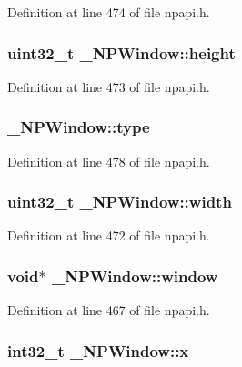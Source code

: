 Definition at line 474 of file npapi.h.

\hypertarget{struct___n_p_window_a971f3f5aecbf2d5b0796bb0b6c4339c1}{
\subsubsection[{height}]{\setlength{\rightskip}{0pt plus 5cm}uint32\_\-t {\bf \_\-NPWindow::height}}}
\label{struct___n_p_window_a971f3f5aecbf2d5b0796bb0b6c4339c1}


Definition at line 473 of file npapi.h.

\hypertarget{struct___n_p_window_a56b609c5f878624bae8fa3840cff0ea4}{
\subsubsection[{type}]{ {\bf \_\-NPWindow::type}}}
\label{struct___n_p_window_a56b609c5f878624bae8fa3840cff0ea4}


Definition at line 478 of file npapi.h.

\hypertarget{struct___n_p_window_a108a91a5fdc3e8130e0d40406612bd65}{
\subsubsection[{width}]{\setlength{\rightskip}{0pt plus 5cm}uint32\_\-t {\bf \_\-NPWindow::width}}}
\label{struct___n_p_window_a108a91a5fdc3e8130e0d40406612bd65}


Definition at line 472 of file npapi.h.

\hypertarget{struct___n_p_window_aba7452f14f927e3261ad97861838b494}{
\subsubsection[{window}]{\setlength{\rightskip}{0pt plus 5cm}void$\ast$ {\bf \_\-NPWindow::window}}}
\label{struct___n_p_window_aba7452f14f927e3261ad97861838b494}


Definition at line 467 of file npapi.h.

\hypertarget{struct___n_p_window_ad07051b09df8bba4340460148e2712d3}{
\subsubsection[{x}]{\setlength{\rightskip}{0pt plus 5cm}int32\_\-t {\bf \_\-NPWindow::x}}}
\label{struct___n_p_window_ad07051b09df8bba4340460148e2712d3}


